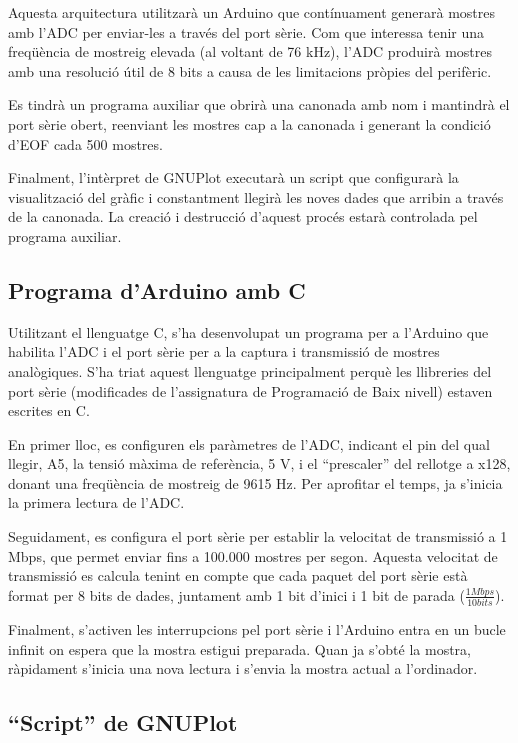 \documentclass{tfgitic}[2023/06/30]
\begin{document}
Aquesta arquitectura utilitzarà un Arduino que contínuament generarà
mostres amb l'ADC per enviar-les a través del port sèrie. Com que
interessa tenir una freqüència de mostreig elevada (al voltant de 76
kHz), l'ADC produirà mostres amb una resolució útil de 8 bits a causa
de les limitacions pròpies del perifèric.

Es tindrà un programa auxiliar que obrirà una canonada amb nom i
mantindrà el port sèrie obert, reenviant les mostres cap a la canonada
i generant la condició d'EOF cada 500 mostres.

Finalment, l'intèrpret de GNUPlot executarà un script que configurarà
la visualització del gràfic i constantment llegirà les noves dades que
arribin a través de la canonada. La creació i destrucció d'aquest
procés estarà controlada pel programa auxiliar.

\subsection{Programa d'Arduino amb C}
\label{programa-arduino-c}

Utilitzant el llenguatge C, s'ha desenvolupat un programa per a
l'Arduino que habilita l'ADC i el port sèrie per a la captura i
transmissió de mostres analògiques. S'ha triat aquest llenguatge
principalment perquè les llibreries del port sèrie (modificades de
l'assignatura de Programació de Baix nivell) estaven escrites en C.

En primer lloc, es configuren els paràmetres de l'ADC, indicant el pin
del qual llegir, A5, la tensió màxima de referència, 5 V, i el
``prescaler'' del rellotge a x128, donant una freqüència de mostreig
de 9615 Hz. Per aprofitar el temps, ja s'inicia la primera lectura de
l'ADC.

Seguidament, es configura el port sèrie per establir la velocitat de
transmissió a 1 Mbps, que permet enviar fins a 100.000 mostres per
segon. Aquesta velocitat de transmissió es calcula tenint en compte
que cada paquet del port sèrie està format per 8 bits de dades,
juntament amb 1 bit d'inici i 1 bit de parada ($\frac{1 Mbps}{10 bits}$).

Finalment, s'activen les interrupcions pel port sèrie i l'Arduino
entra en un bucle infinit on espera que la mostra estigui
preparada. Quan ja s'obté la mostra, ràpidament s'inicia una nova
lectura i s'envia la mostra actual a l'ordinador.

\subsection{``Script'' de GNUPlot}
\end{document}
